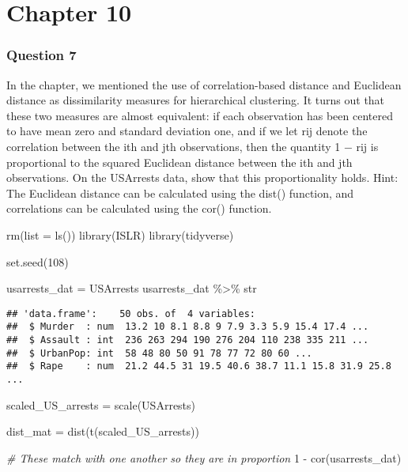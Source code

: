 \documentclass[
]{article}
\newenvironment{Shaded}{\begin{snugshade}}{\end{snugshade}}
\newcommand{\AttributeTok}[1]{\textcolor[rgb]{0.77,0.63,0.00}{#1}}
\newcommand{\CommentTok}[1]{\textcolor[rgb]{0.56,0.35,0.01}{\textit{#1}}}
\newcommand{\DecValTok}[1]{\textcolor[rgb]{0.00,0.00,0.81}{#1}}
\newcommand{\FunctionTok}[1]{\textcolor[rgb]{0.00,0.00,0.00}{#1}}
\newcommand{\NormalTok}[1]{#1}
\newcommand{\OtherTok}[1]{\textcolor[rgb]{0.56,0.35,0.01}{#1}}
\newcommand{\SpecialCharTok}[1]{\textcolor[rgb]{0.00,0.00,0.00}{#1}}
\begin{document}
\hypertarget{chapter-10}{%
\section{Chapter 10}\label{chapter-10}}

\hypertarget{question-7}{%
\subsubsection{Question 7}\label{question-7}}

In the chapter, we mentioned the use of correlation-based distance and
Euclidean distance as dissimilarity measures for hierarchical
clustering. It turns out that these two measures are almost equivalent:
if each observation has been centered to have mean zero and standard
deviation one, and if we let rij denote the correlation between the ith
and jth observations, then the quantity 1 − rij is proportional to the
squared Euclidean distance between the ith and jth observations. On the
USArrests data, show that this proportionality holds. Hint: The
Euclidean distance can be calculated using the dist() function, and
correlations can be calculated using the cor() function.

\begin{Shaded}
\begin{Highlighting}[]
\FunctionTok{rm}\NormalTok{(}\AttributeTok{list =} \FunctionTok{ls}\NormalTok{())}
\FunctionTok{library}\NormalTok{(ISLR)}
\FunctionTok{library}\NormalTok{(tidyverse)}

\FunctionTok{set.seed}\NormalTok{(}\DecValTok{108}\NormalTok{)}

\NormalTok{usarrests\_dat }\OtherTok{=}\NormalTok{ USArrests}
\NormalTok{usarrests\_dat }\SpecialCharTok{\%\textgreater{}\%}\NormalTok{ str}
\end{Highlighting}
\end{Shaded}

\begin{verbatim}
## 'data.frame':    50 obs. of  4 variables:
##  $ Murder  : num  13.2 10 8.1 8.8 9 7.9 3.3 5.9 15.4 17.4 ...
##  $ Assault : int  236 263 294 190 276 204 110 238 335 211 ...
##  $ UrbanPop: int  58 48 80 50 91 78 77 72 80 60 ...
##  $ Rape    : num  21.2 44.5 31 19.5 40.6 38.7 11.1 15.8 31.9 25.8 ...
\end{verbatim}

\begin{Shaded}
\begin{Highlighting}[]
\NormalTok{scaled\_US\_arrests }\OtherTok{=} \FunctionTok{scale}\NormalTok{(USArrests)}

\NormalTok{dist\_mat }\OtherTok{=} \FunctionTok{dist}\NormalTok{(}\FunctionTok{t}\NormalTok{(scaled\_US\_arrests))}

\CommentTok{\# These match with one another so they are in proportion}
\DecValTok{1} \SpecialCharTok{{-}} \FunctionTok{cor}\NormalTok{(usarrests\_dat)}
\end{Highlighting}
\end{Shaded}
\end{document}
